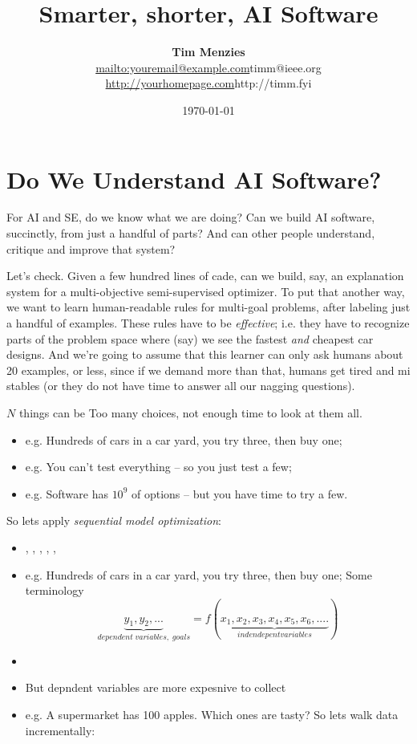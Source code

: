 \documentclass[twocolumn,landscape]{book}
\title{Smarter, shorter, AI Software}
\author{{\bf Tim Menzies}\\ \url{mailto:youremail@example.com}{timm@ieee.org} \\ \url{http://yourhomepage.com}{http://timm.fyi}}
\date{\today}
\begin{document}
\maketitle
\tableofcontents

\chapter{Do We Understand AI Software?}
For AI and SE, do we know what we are doing? 
Can we build AI software, succinctly, from just a handful of parts? And can other people
understand, critique and improve that system?

Let's check. Given a few hundred lines of cade,
can we build, say, an explanation system for a multi-objective semi-supervised optimizer.
To put that another way,
we want to learn human-readable rules for multi-goal problems, after labeling just a handful of examples.
    These  rules have to  be {\em effective}; i.e. they have to  recognize  parts of the problem space where (say) we see the fastest {\em and} cheapest car designs.
And we're going to assume that this learner can only ask humans about 20 examples, or less,  since if we demand more than that,
    humans get tired and mi stables (or they do not have time to answer all our nagging questions).



$N$ things can be 
Too many choices, not enough time to look at them all.
\begin{itemize}
\item e.g. Hundreds of cars in a car yard, you try three, then buy one;
\item e.g. You can't test everything -- so you just test a few;
\item e.g. Software has $10^9$ of options -- but you  have time to try a few.
\end{itemize}
So lets apply {\em sequential model optimization}:
\begin{itemize}
\item \citet{xia2020sequential}, 
\citet{hutter2011sequential},
\citet{nair2018finding},
\citet{hsu2018arrow},
\citet{mockus1989bayesian},
\citet{golovin17}



\item e.g. Hundreds of cars in a car yard, you try three, then buy one;
Some terminology
\[ \underbrace{y_1,y_2,...}_{\mathit{}dependent\;variables,\;goals} = f(\underbrace{x_1, x_2, x_3, x_4, x_5, x_6,....}_{\mathit{indendepent variables}})
\]
\end{itemize}
\begin{itemize}
\item 
\item But depndent variables are more expesnive to collect 
\item e.g. A supermarket has 100 apples. Which ones are tasty?
So lets walk data incrementally:
\end{itemize}
\end{document}
